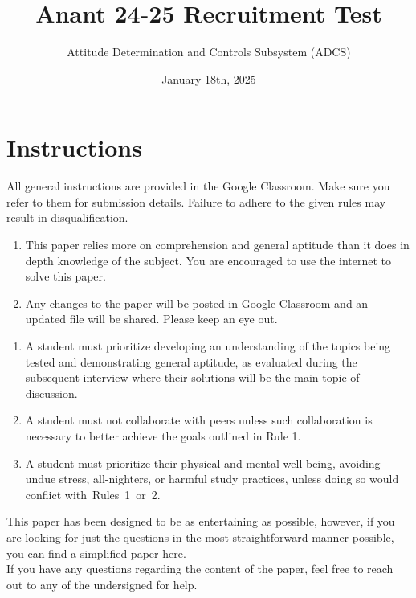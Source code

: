 \documentclass[a4paper, 12pt]{exam}
\begin{document}
	\title{Anant 24-25 Recruitment Test}
	\author{Attitude Determination and Controls Subsystem (ADCS)}
	\date{January 18th, 2025}
	\maketitle
	\section*{Instructions}
	All general instructions are provided in the Google Classroom. Make sure you refer to them for submission details. Failure to adhere to the given rules may result in disqualification. 
	\begin{enumerate}[]
		\item This paper relies more on comprehension and general aptitude than it does in depth knowledge of the subject. You are encouraged to use the internet to solve this paper.
		\item Any changes to the paper will be posted in Google Classroom and an updated file will be shared. Please keep an eye out.
	\end{enumerate} 
	\begin{enumerate}[label = \textbf{Rule \arabic* }:, leftmargin=5em]
		\item A student must prioritize developing an understanding of the topics being tested and demonstrating general aptitude, as evaluated during the subsequent interview where their solutions will be the main topic of discussion.
		
		\item A student must not collaborate with peers unless such collaboration is necessary to better achieve the goals outlined in Rule 1.
		
		\item A student must prioritize their physical and mental well-being, avoiding undue stress, all-nighters, or harmful study practices, unless doing so would conflict with Rules 1 or 2.
	\end{enumerate}
This paper has been designed to be as entertaining as possible, however, if you are looking for just the questions in the most straightforward manner possible, you can find a simplified paper \href{https://drive.google.com/file/d/1RRXrB0pM6YR5tkZHAbtB8Su_wCLuLUDB/view?usp=sharing}{here}.\\		
If you have any questions regarding the content of the paper, feel free to reach out to any of the undersigned for help. \\
\end{document}
